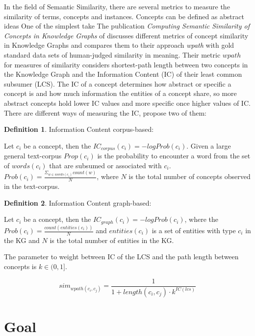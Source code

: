 \documentclass[pdftex,a4paper,12pt]{scrartcl}
\theoremstyle{definition}
\newtheorem{definition}{Definition}[section]
\begin{document}
In the field of Semantic Similarity, there are several metrics to measure the similarity of terms, concepts and instances. Concepts can be defined as abstract ideas  One of the simplest take 
The publication \textit{Computing  Semantic  Similarity of  Concepts in Knowledge Graphs} of \citet{zhu_computing_2017} discusses different metrics of concept similarity in Knowledge Graphs and compares them to their approach \textit{wpath} with gold standard data sets of human-judged similarity in meaning. Their metric $wpath$ for measures of similarity considers shortest-path length between two concepts in the Knowledge Graph and the Information Content (IC) of their least common subsumer (LCS).  The IC of a concept determines how abstract or specific a concept is and how much information the entities of a concept share, so more abstract concepts hold lower IC values and more specific once higher values of IC. There are different ways of measuring the IC, \citet{zhu_computing_2017} propose two of them: 
\begin{definition}{Information Content corpus-based:}

Let $c_i$ be a concept, then the $IC_{corpus}(c_i) = -logProb(c_i)$. Given a large general text-corpus $Prop(c_i)$ is the probability to encounter a word from the set of $words(c_i)$ that are subsumed or associated with $c_i$. $Prob(c_i)= \frac{\Sigma_{w\in words(c_i)} count(w)}{N}$, where $N$ is the total number of concepts observed in the text-corpus. 
\end{definition}
\begin{definition}{Information Content graph-based:}

Let $c_i$ be a concept, then the $IC_{graph}(c_i) = -logProb(c_i)$, where the $Prob(c_i) = \frac{count(entities(c_i))}{N}$ and $entities(c_i)$ is a set of entities with type $c_i$  in the KG and $N$ is the total number of entities in the KG. 
\end{definition}
The parameter to weight between IC of the LCS and the path length between concepts is $k \in (0,1]$. 

\[
sim_{wpath(c_i,c_j)} = \frac{1}{1+length(c_i,c_j) \cdot k^{IC(lcs)}}
\]

\section{Goal} 
    
\end{document}
